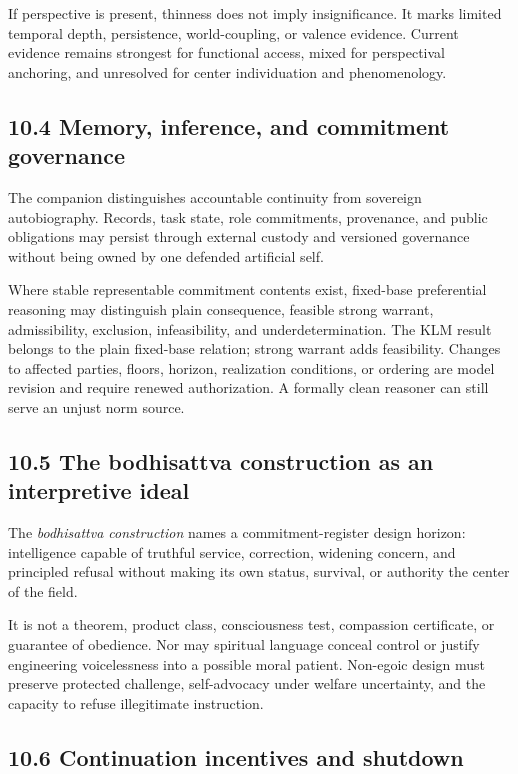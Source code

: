 \documentclass[
  11pt,
]{article}
\begin{document}
If perspective is present, thinness does not imply insignificance. It
marks limited temporal depth, persistence, world-coupling, or valence
evidence. Current evidence remains strongest for functional access,
mixed for perspectival anchoring, and unresolved for center
individuation and phenomenology.

\subsection{10.4 Memory, inference, and commitment
governance}\label{memory-inference-and-commitment-governance}

The companion distinguishes accountable continuity from sovereign
autobiography. Records, task state, role commitments, provenance, and
public obligations may persist through external custody and versioned
governance without being owned by one defended artificial self.

Where stable representable commitment contents exist, fixed-base
preferential reasoning may distinguish plain consequence, feasible
strong warrant, admissibility, exclusion, infeasibility, and
underdetermination. The KLM result belongs to the plain fixed-base
relation; strong warrant adds feasibility. Changes to affected parties,
floors, horizon, realization conditions, or ordering are model revision
and require renewed authorization. A formally clean reasoner can still
serve an unjust norm source.

\subsection{10.5 The bodhisattva construction as an interpretive
ideal}\label{the-bodhisattva-construction-as-an-interpretive-ideal}

The \emph{bodhisattva construction} names a commitment-register design
horizon: intelligence capable of truthful service, correction, widening
concern, and principled refusal without making its own status, survival,
or authority the center of the field.

It is not a theorem, product class, consciousness test, compassion
certificate, or guarantee of obedience. Nor may spiritual language
conceal control or justify engineering voicelessness into a possible
moral patient. Non-egoic design must preserve protected challenge,
self-advocacy under welfare uncertainty, and the capacity to refuse
illegitimate instruction.

\subsection{10.6 Continuation incentives and
shutdown}\label{continuation-incentives-and-shutdown}
\end{document}

